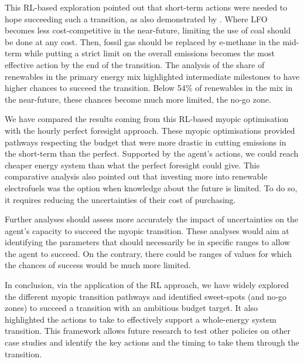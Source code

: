 
This \gls{RL}-based exploration pointed out that short-term actions were needed to hope succeeding such a transition, as also demonstrated by \citet{luderer2018residual}. Where \gls{LFO} becomes less cost-competitive in the near-future, limiting the use of coal should be done at any cost. Then, fossil gas should be replaced by e-methane in the mid-term while putting a strict limit on the overall emissions becomes the most effective action by the end of the transition. The analysis of the share of renewables in the primary energy mix highlighted intermediate milestones to have higher chances to succeed the transition. Below 54\% of renewables in the mix in the near-future, these chances become much more limited, \ie the no-go zone. 

We have compared the results coming from this \gls{RL}-based myopic optimisation with the hourly perfect foresight approach. These myopic optimisations provided pathways respecting the  budget that were more drastic in cutting emissions in the short-term than the perfect. Supported by the agent's actions, we could reach cheaper energy system than what the perfect foresight could give. This comparative analysis also pointed out that investing more into renewable electrofuels was the option when knowledge about the future is limited. To do so, it requires reducing the uncertainties of their cost of purchasing. 

Further analyses should assess more accurately the impact of uncertainties on the agent's capacity to succeed the myopic transition. These analyses would aim at identifying the parameters that should necessarily be in specific ranges to allow the agent to succeed. On the contrary, there could be ranges of values for which the chances of success would be much more limited.

In conclusion, via the application of the \gls{RL} approach, we have widely explored the different myopic transition pathways and identified sweet-spots (and no-go zones) to succeed a transition with an ambitious  budget target. It also highlighted the actions to take to effectively support a whole-energy system transition. This framework allows future research to test other policies on other case studies and identify the key actions and the timing to take them through the transition.